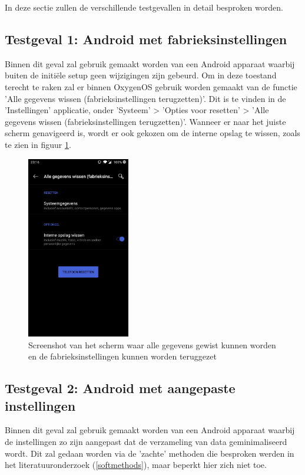 In deze sectie zullen de verschillende testgevallen in detail besproken worden.

\subsection{Testgeval 1: Android met fabrieksinstellingen}
\label{sec:testgeval1}
Binnen dit geval zal gebruik gemaakt worden van een Android apparaat waarbij buiten de initiële setup geen wijzigingen zijn gebeurd. Om in deze toestand terecht te raken zal er binnen OxygenOS gebruik worden gemaakt van de functie 'Alle gegevens wissen (fabrieksinstellingen terugzetten)'. Dit is te vinden in de 'Instellingen' applicatie, onder 'Systeem' >  'Opties voor resetten' > 'Alle gegevens wissen (fabrieksinstellingen terugzetten)'. Wanneer er naar het juiste scherm genavigeerd is, wordt er ook gekozen om de interne opslag te wissen, zoals te zien in figuur \ref{fig:fabrieksinstellingen}.

\begin{figure}
    \centering
    \includegraphics[width=0.4\textwidth]{img/fabrieksinstellingen.jpg}
    \caption{Screenshot van het scherm waar alle gegevens gewist kunnen worden en de fabrieksinstellingen kunnen worden teruggezet}
    \label{fig:fabrieksinstellingen}
\end{figure}


\subsection{Testgeval 2: Android met aangepaste instellingen}
\label{sec:testgeval2}
Binnen dit geval zal gebruik gemaakt worden van een Android apparaat waarbij de instellingen zo zijn aangepast dat de verzameling van data geminimaliseerd wordt. Dit zal gedaan worden via de 'zachte' methoden die besproken werden in het literatuuronderzoek (\ref{softmethods}), maar beperkt hier zich niet toe.

